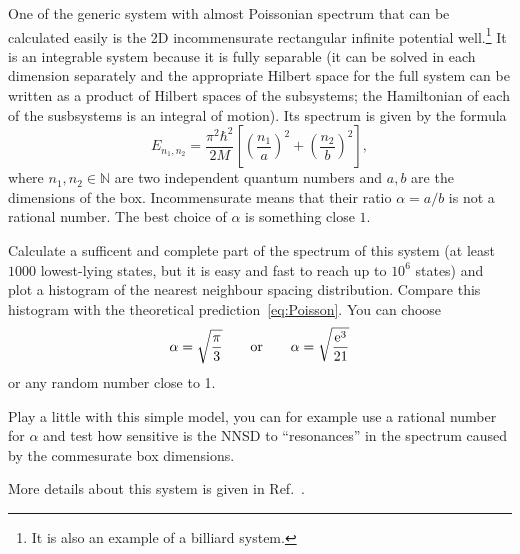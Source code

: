\documentclass[a4paper,11pt,twoside]{article}
\begin{document}
        \begin{task}\label{task:2Dbox}
            One of the generic system with almost Poissonian spectrum that can be calculated easily is the 2D incommensurate rectangular infinite potential well.\footnote{It is also an example of a billiard system.}
            It is an integrable system because it is fully separable (it can be solved in each dimension separately and the appropriate Hilbert space for the full system can be written as a product of Hilbert spaces of the subsystems; the Hamiltonian of each of the susbsystems is an integral of motion).
            Its spectrum is given by the formula
            \begin{equation}
                E_{n_{1},n_{2}}
                =\frac{\pi^{2}\hbar^{2}}{2M}\left[\left(\frac{n_{1}}{a}\right)^{2}+\left(\frac{n_{2}}{b}\right)^{2}\right],
                \label{eq:2Dbox}
            \end{equation}
            where $n_{1},n_{2}\in\mathbb{N}$ are two independent quantum numbers and $a,b$ are the dimensions of the box.
            Incommensurate means that their ratio $\alpha=a/b$ is not a rational number.
            The best choice of $\alpha$ is something close $1$.

            Calculate a sufficent and complete part of the spectrum of this system (at least $1000$ lowest-lying states, but it is easy and fast to reach up to $10^6$ states) and plot a histogram of the nearest neighbour spacing distribution.
            Compare this histogram with the theoretical prediction~\eqref{eq:Poisson}.
            You can choose
            \begin{equation}
                \alpha=\sqrt{\frac{\pi}{3}}\qquad\text{or}\qquad\alpha=\sqrt{\frac{\operatorname{e}^{3}}{21}}
            \end{equation}
            or any random number close to 1.

            Play a little with this simple model, you can for example use a rational number for $\alpha$ and test how sensitive is the NNSD to ``resonances'' in the spectrum caused by the commesurate box dimensions.

            More details about this system is given in Ref.~\cite{Cas85}.
        \end{task}
\end{document}
